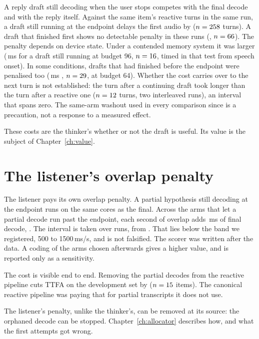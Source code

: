 A reply draft still decoding when the user stops competes with the final
decode and with the reply itself. Against the same item's reactive turns in
the same run, a draft still running at the endpoint delays the first audio by
\ThinkerOverlap{} ($n=258$ turns). A draft that finished first
shows no detectable penalty in these runs (\ThinkerFinished,
$n=66$). The penalty depends on device state. Under a
contended memory system it was larger
(\OnsetNinetySixRun\,ms \OnsetNinetySixRunCI{} for a draft still running at budget 96, $n=16$, timed in that test from speech onset). In some conditions, drafts that had finished before the endpoint were
penalised too (\OnsetSixtyFourFin\,ms \OnsetSixtyFourFinCI, $n=29$, at budget 64). Whether the cost carries over to the next turn is not established: the turn
after a continuing draft took \Carry{} longer than the turn after a reactive
one ($n=12$ turns, two interleaved runs), an interval that spans zero.
The same-arm washout used in every comparison since is a precaution, not a
response to a measured effect.

These costs are the thinker's whether or not the draft is useful. Its value is
the subject of Chapter~\ref{ch:value}.

\section{The listener's overlap penalty}
\label{sec:listener-penalty}

The listener pays its own overlap penalty. A partial hypothesis still decoding
at the endpoint runs on the same cores as the final. Across the arms that let
a partial decode run past the endpoint, each second of overlap adds
\ListenerC\,ms of final decode, \ListenerCCI. The interval is taken over
runs, from \PtwoaPop. That lies below the band we registered, 500 to
1500\,ms/s, and is not falsified. The scorer was written after the data. A
coding of the arms chosen afterwards gives a higher value, and is reported
only as a sensitivity.

The cost is visible end to end. Removing the partial decodes from the
reactive pipeline cuts TTFA on the development set by \PartialsDev{}
($n=15$ items). The canonical reactive pipeline was paying that
for partial transcripts it does not use.

The listener's penalty, unlike the thinker's, can be removed at its source:
the orphaned decode can be stopped. Chapter~\ref{ch:allocator} describes how,
and what the first attempts got wrong.

